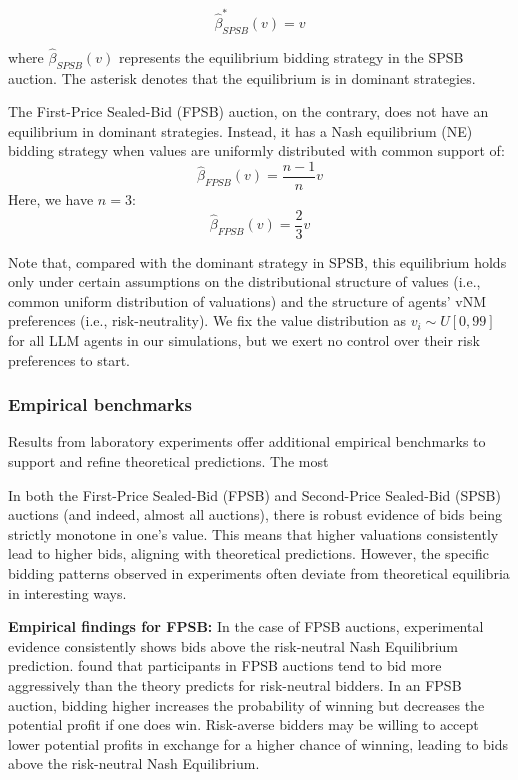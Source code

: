 \documentclass{article} %
\begin{document}
\begin{equation}
    \hat{\beta}^*_{SPSB}(v) = v
\end{equation}

where $\hat{\beta}_{SPSB}(v)$ represents the equilibrium bidding strategy in the SPSB auction. The asterisk denotes that the equilibrium is in dominant strategies.


The First-Price Sealed-Bid (FPSB) auction, on the contrary, does not have an equilibrium in dominant strategies. 
Instead, it has a Nash equilibrium (NE) bidding strategy when values are uniformly distributed with common support of:
\begin{equation}
\hat{\beta}_{FPSB}(v) =  \frac{n-1}{n} v
\end{equation}
Here, we have $n = 3$:
\begin{equation}
\hat{\beta}_{FPSB}(v) = \frac{2}{3}v
\end{equation}

Note that, compared with the dominant strategy in SPSB, this equilibrium holds only under certain assumptions on the distributional structure of values (i.e., common uniform distribution of valuations) and the structure of agents' vNM preferences (i.e., risk-neutrality). We fix the value distribution as $v_i \sim U[0, 99]$ for all LLM agents in our simulations, but we exert no control over their risk preferences to start. 

\subsubsection{Empirical benchmarks}
Results from laboratory experiments offer additional empirical benchmarks to support and refine theoretical predictions.  
The most 

In both the First-Price Sealed-Bid (FPSB) and Second-Price Sealed-Bid (SPSB) auctions (and indeed, almost all auctions), there is robust evidence of bids being strictly monotone in one's value. 
This means that higher valuations consistently lead to higher bids, aligning with theoretical predictions. 
However, the specific bidding patterns observed in experiments often deviate from theoretical equilibria in interesting ways.

\textbf{Empirical findings for FPSB:}
In the case of FPSB auctions, experimental evidence consistently shows bids above the risk-neutral Nash Equilibrium prediction. \cite{cox1988theory} found that participants in FPSB auctions tend to bid more aggressively than the theory predicts for risk-neutral bidders.
In an FPSB auction, bidding higher increases the probability of winning but decreases the potential profit if one does win. 
Risk-averse bidders may be willing to accept lower potential profits in exchange for a higher chance of winning, leading to bids above the risk-neutral Nash Equilibrium.
\end{document}
